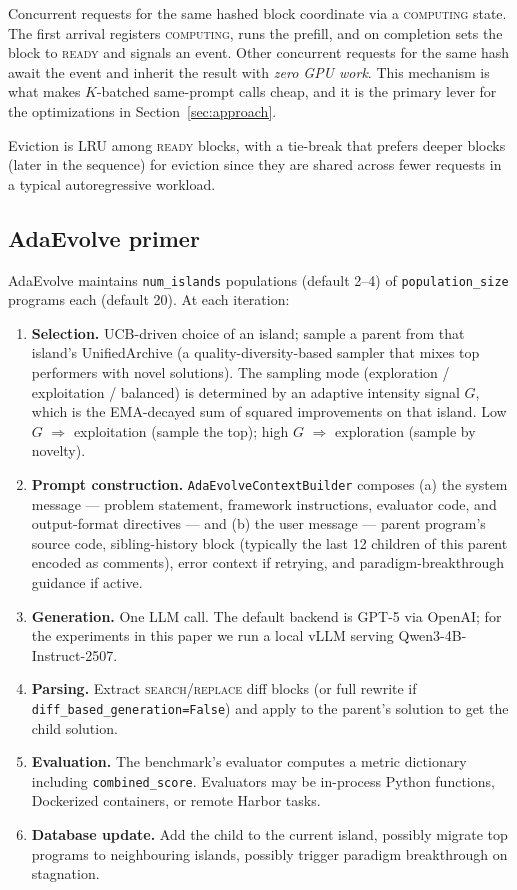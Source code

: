 \documentclass[11pt]{article}
\newcommand{\adaev}{AdaEvolve}
\begin{document}
Concurrent requests for the same hashed block coordinate via a
\textsc{computing} state. The first arrival registers
\textsc{computing}, runs the prefill, and on completion sets the
block to \textsc{ready} and signals an event. Other concurrent
requests for the same hash await the event and inherit the result with
\emph{zero GPU work}. This mechanism is what makes $K$-batched
same-prompt calls cheap, and it is the primary lever for the
optimizations in Section~\ref{sec:approach}.

Eviction is LRU among \textsc{ready} blocks, with a tie-break that
prefers deeper blocks (later in the sequence) for eviction since they
are shared across fewer requests in a typical autoregressive
workload.

\subsection{\adaev{} primer}

\adaev{} maintains \verb|num_islands| populations (default 2--4) of
\verb|population_size| programs each (default 20). At each iteration:

\begin{enumerate}
\item \textbf{Selection.} UCB-driven choice of an island; sample a
  parent from that island's UnifiedArchive (a quality-diversity-based
  sampler that mixes top performers with novel solutions). The
  sampling mode (exploration / exploitation / balanced) is determined
  by an adaptive intensity signal $G$, which is the EMA-decayed sum
  of squared improvements on that island. Low $G$ $\Rightarrow$
  exploitation (sample the top); high $G$ $\Rightarrow$ exploration
  (sample by novelty).
\item \textbf{Prompt construction.}
  \texttt{AdaEvolveContextBuilder} composes (a) the system message
  --- problem statement, framework instructions, evaluator code, and
  output-format directives --- and (b) the user message --- parent
  program's source code, sibling-history block (typically the last
  12 children of this parent encoded as comments), error context if
  retrying, and paradigm-breakthrough guidance if active.
\item \textbf{Generation.} One LLM call. The default backend is
  GPT-5 via OpenAI; for the experiments in this paper we run a local
  vLLM serving Qwen3-4B-Instruct-2507.
\item \textbf{Parsing.} Extract \textsc{search}/\textsc{replace}
  diff blocks (or full rewrite if \verb|diff_based_generation=False|)
  and apply to the parent's solution to get the child solution.
\item \textbf{Evaluation.} The benchmark's evaluator computes a
  metric dictionary including \verb|combined_score|. Evaluators may
  be in-process Python functions, Dockerized containers, or remote
  Harbor tasks.
\item \textbf{Database update.} Add the child to the current island,
  possibly migrate top programs to neighbouring islands, possibly
  trigger paradigm breakthrough on stagnation.
\end{enumerate}
\end{document}
